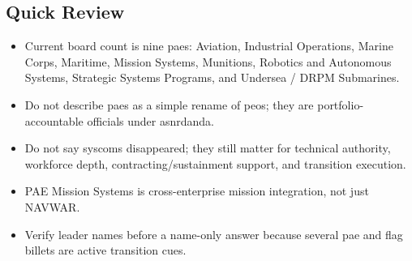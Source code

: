 \documentclass[../main.tex]{subfiles}
\begin{document}
\subsection{Quick Review}
\begin{itemize}
  \item Current board count is nine \acp{pae}: Aviation, Industrial Operations, Marine Corps, Maritime, Mission Systems, Munitions, Robotics and Autonomous Systems, Strategic Systems Programs, and Undersea / DRPM Submarines.
  \item Do not describe \acp{pae} as a simple rename of \acp{peo}; they are portfolio-accountable officials under \ac{asnrdanda}.
  \item Do not say \acp{syscom} disappeared; they still matter for technical authority, workforce depth, contracting/sustainment support, and transition execution.
  \item PAE Mission Systems is cross-enterprise mission integration, not just NAVWAR.
  \item Verify leader names before a name-only answer because several \ac{pae} and flag billets are active transition cues.
\end{itemize}

\end{document}
